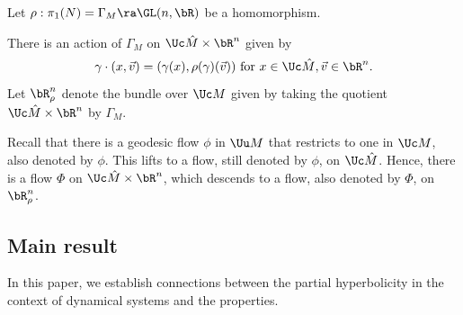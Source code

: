 Let $\rho: \pi_1(N) = \Gamma_M \ra \GL(n, \bR)$ be a homomorphism. 


There is an action of $\Gamma_M$ 
on $\Uc \hat{M} \times \bR^n$ given by 
\[ \gamma\cdot(x, \vec{v})  = (\gamma(x), \rho(\gamma)(\vec{v})) 
\text{ for } x \in \Uc\hat{M}, \vec{v} \in \bR^n.\]
Let $\bR^n_{\rho}$ denote the bundle over $\Uc M$
 given by taking the quotient $\Uc \hat{M} \times \bR^n$ by $\Gamma_M$. 

Recall that there is a geodesic flow $\phi$ in $\Uu M$ that restricts to one in $\Uc M$, also denoted by $\phi$. This lifts to a flow, still denoted by $\phi$, on $\Uc \hat M$. Hence, there is a flow $\Phi$ on $\Uc \hat M \times \bR^n$, which descends to a flow, also denoted by $\Phi$, on $\bR^n_{\rho}$.



\subsection{Main result} 
In this paper, we establish connections between the partial hyperbolicity in the context of dynamical systems and the  properties. 




